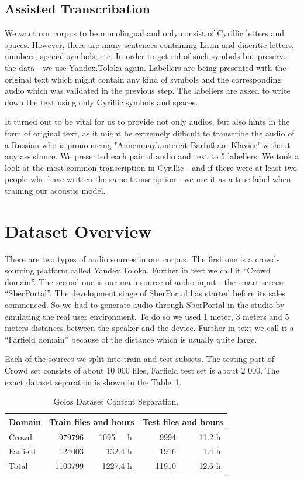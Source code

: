 \documentclass[a4paper]{article}
\begin{document}
\subsection{Assisted Transcribation}
We want our corpus to be monolingual and only consist of Cyrillic letters and spaces. However, there are many sentences containing Latin and diacritic letters, numbers, special symbols, etc. In order to get rid of such symbols but preserve the data - we use Yandex.Toloka again. Labellers are being presented with the original text which might contain any kind of symbols and the corresponding audio which was validated in the previous step. The labellers are asked to write down the text using only Cyrillic symbols and spaces. 

It turned out to be vital for us to provide not only audios, but also hints in the form of original text, as it might be extremely difficult to transcribe the audio of a Russian who is pronouncing "Annenmaykantereit Barfuß am Klavier"  without any assistance. We presented each pair of audio and text to 5 labellers. We took a look at the most common transcription in Cyrillic - and if there were at least two people who have written the same transcription - we use it as a true label when training our acoustic model.


\section{Dataset Overview}

There are two types of audio sources in our corpus. The first one is a crowd-sourcing platform called Yandex.Toloka. Further in text we call it “Crowd domain”. The second one is our main source of audio input - the smart screen “SberPortal”. The development stage of SberPortal has started before its sales commenced. So we had to generate audio through SberPortal in the studio by emulating the real user environment. To do so we used 1 meter, 3 meters and 5 meters distances between the speaker and the device. Further in text we call it a “Farfield domain” because of the distance which is usually quite large.

Each of the sources we split into train and test subsets. The testing part of Crowd set consists of about 10 000 files, Farfield test set is about 2 000. The exact dataset separation is shown in the Table~\ref{tab:dataset_separation}. 

\begin{table}[th]
  \caption{Golos Dataset Content Separation.}
  \label{tab:dataset_separation}
  \centering
  \begin{tabular}{ l|r|r|r|r }
    \toprule
    \multicolumn{1}{l|}{\textbf{Domain}} & \multicolumn{2}{c|}{\textbf{Train files and hours}} & \multicolumn{2}{c}{\textbf{Test files and hours}} \\
    \midrule
    Crowd  & 979796 & 1095~~~h.  & 9994 & 11.2 h. \\
    Farfield & 124003 & 132.4 h. &  1916 & 1.4 h. \\
    \bottomrule
    Total  & 1103799 & 1227.4 h. & 11910 & 12.6 h. \\
  \end{tabular}
\end{table}
\end{document}
